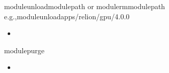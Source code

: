 \documentclass[a4paper,11pt,english]{sphinxmanual}
\begin{document}
\begin{sphinxVerbatim}[commandchars=\\\{\}]
\PYGZdl{}\PYGZgt{}moduleunload\PYGZlt{}module\PYGZus{}path\PYGZgt{}
or
\PYGZdl{}\PYGZgt{}modulerm\PYGZlt{}module\PYGZus{}path\PYGZgt{}
e.g.,\PYGZdl{}\PYGZgt{}moduleunloadapps/relion/gpu/4.0.0
\end{sphinxVerbatim}
\begin{itemize}
\item {} 
\sphinxAtStartPar
{}

\end{itemize}

\begin{sphinxVerbatim}[commandchars=\\\{\}]
\PYGZdl{}\PYGZgt{}modulepurge
\end{sphinxVerbatim}
\begin{itemize}
\item {} 
\sphinxAtStartPar
{}

\end{itemize}
\end{document}
